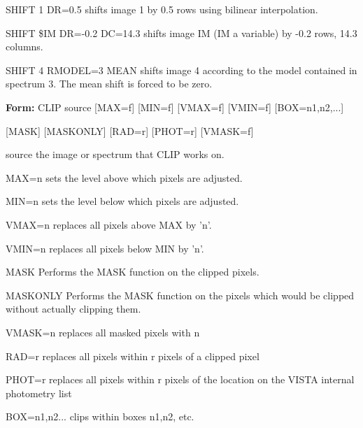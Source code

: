 {\newpage\clearpage
{}%
\begin{example}
  \item[SHIFT 1 DR=0.5\hfill]{shifts image 1 by 0.5 rows using
     bilinear interpolation.}
  \item[SHIFT \$IM DR=-0.2 DC=14.3\hfill]{shifts image IM (IM a variable)
     by -0.2 rows, 14.3 columns.}
  \item[SHIFT 4 RMODEL=3 MEAN  \hfill]{shifts image 4 according to the
     model contained in spectrum 3.
     The mean shift is forced to be zero.}
\end{example}%
\lthtmlfigureZ
\lthtmlcheckvsize\clearpage}

{\newpage\clearpage
{}%
\begin{command}
  \item[\textbf{Form: } CLIP source {[MAX=f]} {[MIN=f]} {[VMAX=f]} {[VMIN=f]} 
       {[BOX=n1,n2,...]}\hfill]{}
  \item[]{{[MASK]} {[MASKONLY]} {[RAD=r]} {[PHOT=r]} {[VMASK=f]}}
  \item[source]{the image or spectrum that CLIP works on.}
  \item[MAX=n]{sets the level above which pixels are adjusted.}
  \item[MIN=n]{sets the level below which pixels are adjusted.}
  \item[VMAX=n]{replaces all pixels above MAX by 'n'.}
  \item[VMIN=n]{replaces all pixels below MIN by 'n'.}
  \item[MASK]{Performs the MASK function on the clipped pixels.}
  \item[MASKONLY]{Performs the MASK function on the pixels which
       would be clipped without actually clipping them.}
  \item[VMASK=n]{replaces all masked pixels with n}
  \item[RAD=r]{replaces all pixels within r pixels of a clipped pixel}
  \item[PHOT=r]{replaces all pixels within r pixels of the location
       on the VISTA internal photometry list}
  \item[BOX=n1,n2...]{clips within boxes n1,n2, etc.}
\end{command}%
\lthtmlfigureZ
\lthtmlcheckvsize\clearpage}

